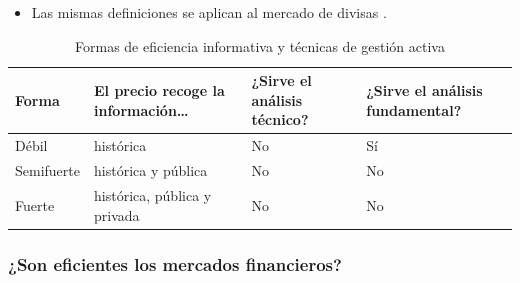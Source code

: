 \documentclass[11pt]{article}
\begin{document}
\begin{itemize}
\begin{enumerate}
\begin{itemize}
    \end{itemize}
     rebautizó después estas formas como contrastes de la predecibilidad de las rentabilidades, estudios de acontecimientos y contrastes de información privada\nocite{Fama1991Efficient}.
  \item {}: la del primer teorema fundamental de la economía del bienestar: no hay otra asignación de los recursos que mejore a alguien sin empeorar a nadie . Es la más exigente: pide mercados completos  y que no haya externalidades ni información asimétrica.
  \end{enumerate}
\item Las mismas definiciones se aplican al mercado de divisas .
\end{itemize}
\begin{table}[H]
\centering
\caption{Formas de eficiencia informativa y técnicas de gestión activa}\label{tab:eficiencia-analisis}
\small
\begin{tabular}{>{\centering\arraybackslash}m{2.6cm}>{\centering\arraybackslash}m{4.6cm}>{\centering\arraybackslash}m{3.0cm}>{\centering\arraybackslash}m{3.0cm}}
\toprule
\rowcolor{tceeazulpalido}\textbf{Forma} & \textbf{El precio recoge la información…} & \textbf{¿Sirve el análisis técnico?} & \textbf{¿Sirve el análisis fundamental?}\\
\midrule
Débil & histórica & \textcolor{tceerojo}{No} & \textcolor{tceeverde}{Sí}\\
\addlinespace[0.2em]
Semifuerte & histórica y pública & \textcolor{tceerojo}{No} & \textcolor{tceerojo}{No}\\
\addlinespace[0.2em]
Fuerte & histórica, pública y privada & \textcolor{tceerojo}{No} & \textcolor{tceerojo}{No}\\
\bottomrule
\end{tabular}
\end{table}

\subsubsection{¿Son eficientes los mercados financieros?}\label{sec:son-eficientes}
\end{document}
